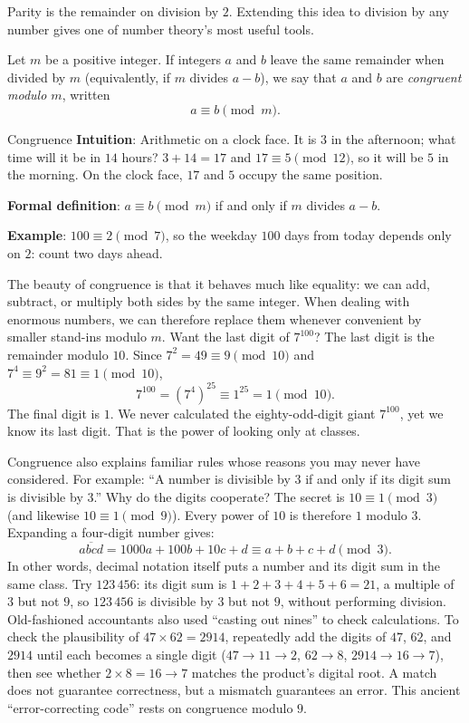Parity is the remainder on division by $2$. Extending this idea to division by any number gives one of number theory's most useful tools.

\begin{dingyi}[Congruence]
Let $m$ be a positive integer. If integers $a$ and $b$ leave the same remainder when divided by $m$ (equivalently, if $m$ divides $a-b$), we say that $a$ and $b$ are \emph{congruent modulo $m$}, written
\[
a\equiv b\pmod{m}.
\]
\end{dingyi}

\begin{shuyu}{Congruence}
\textbf{Intuition}: Arithmetic on a clock face. It is $3$ in the afternoon; what time will it be in $14$ hours? $3+14=17$ and $17\equiv5\pmod{12}$, so it will be $5$ in the morning. On the clock face, $17$ and $5$ occupy the same position.

\textbf{Formal definition}: $a\equiv b\pmod{m}$ if and only if $m$ divides $a-b$.

\textbf{Example}: $100\equiv2\pmod{7}$, so the weekday $100$ days from today depends only on $2$: count two days ahead.
\end{shuyu}

The beauty of congruence is that it behaves much like equality: we can add, subtract, or multiply both sides by the same integer. When dealing with enormous numbers, we can therefore replace them whenever convenient by smaller stand-ins modulo $m$. Want the last digit of $7^{100}$? The last digit is the remainder modulo $10$. Since $7^2=49\equiv9\pmod{10}$ and $7^4\equiv9^2=81\equiv1\pmod{10}$,
\[
7^{100}=(7^4)^{25}\equiv 1^{25}=1\pmod{10}.
\]
The final digit is $1$. We never calculated the eighty-odd-digit giant $7^{100}$, yet we know its last digit. That is the power of looking only at classes.

Congruence also explains familiar rules whose reasons you may never have considered. For example: ``A number is divisible by $3$ if and only if its digit sum is divisible by $3$.'' Why do the digits cooperate? The secret is $10\equiv1\pmod3$ (and likewise $10\equiv1\pmod9$). Every power of $10$ is therefore $1$ modulo $3$. Expanding a four-digit number gives:
\[
\overline{abcd}=1000a+100b+10c+d\equiv a+b+c+d\pmod{3}.
\]
In other words, decimal notation itself puts a number and its digit sum in the same class. Try $123\,456$: its digit sum is $1+2+3+4+5+6=21$, a multiple of $3$ but not $9$, so $123\,456$ is divisible by $3$ but not $9$, without performing division. Old-fashioned accountants also used ``casting out nines'' to check calculations. To check the plausibility of $47\times 62=2914$, repeatedly add the digits of $47$, $62$, and $2914$ until each becomes a single digit ($47\to11\to2$, $62\to8$, $2914\to16\to7$), then see whether $2\times8=16\to7$ matches the product's digital root. A match does not guarantee correctness, but a mismatch guarantees an error. This ancient ``error-correcting code'' rests on congruence modulo $9$.

